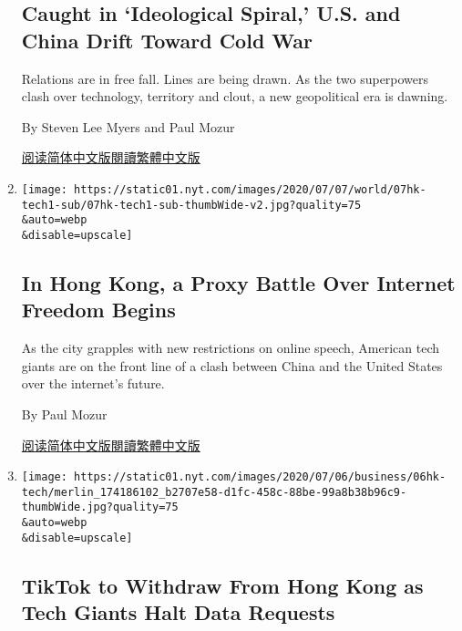 \begin{enumerate}
{  \subsection{Caught in `Ideological Spiral,' U.S. and China Drift
  Toward Cold
  War}\label{caught-in-ideological-spiral-us-and-china-drift-toward-cold-war}}

  Relations are in free fall. Lines are being drawn. As the two
  superpowers clash over technology, territory and clout, a new
  geopolitical era is dawning.

  By Steven Lee Myers and Paul Mozur

  \href{https://cn.nytimes.com/asia-pacific/20200715/cold-war-china-us/}{阅读简体中文版}\href{https://cn.nytimes.com/asia-pacific/20200715/cold-war-china-us/zh-hant/}{閱讀繁體中文版}
\item
  \href{/2020/07/07/business/hong-kong-security-law-tech.html}{}

  \texttt{[image: https://static01.nyt.com/images/2020/07/07/world/07hk-tech1-sub/07hk-tech1-sub-thumbWide-v2.jpg?quality=75\\\&auto=webp\\\&disable=upscale]}

  \hypertarget{in-hong-kong-a-proxy-battle-over-internet-freedom-begins}{%
  \subsection{In Hong Kong, a Proxy Battle Over Internet Freedom
  Begins}\label{in-hong-kong-a-proxy-battle-over-internet-freedom-begins}}

  As the city grapples with new restrictions on online speech, American
  tech giants are on the front line of a clash between China and the
  United States over the internet's future.

  By Paul Mozur

  \href{https://cn.nytimes.com/business/20200708/hong-kong-security-law-tech/}{阅读简体中文版}\href{https://cn.nytimes.com/business/20200708/hong-kong-security-law-tech/zh-hant/}{閱讀繁體中文版}
\item
  \href{/2020/07/06/technology/tiktok-google-facebook-twitter-hong-kong.html}{}

  \texttt{[image: https://static01.nyt.com/images/2020/07/06/business/06hk-tech/merlin\_174186102\_b2707e58-d1fc-458c-88be-99a8b38b96c9-thumbWide.jpg?quality=75\\\&auto=webp\\\&disable=upscale]}

  \hypertarget{tiktok-to-withdraw-from-hong-kong-as-tech-giants-halt-data-requests}{%
  \subsection{TikTok to Withdraw From Hong Kong as Tech Giants Halt Data
  Requests}\label{tiktok-to-withdraw-from-hong-kong-as-tech-giants-halt-data-requests}}


\end{enumerate}

